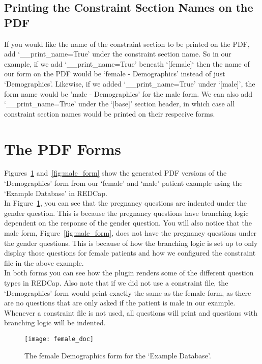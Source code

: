 \documentclass[12pt]{article}
\begin{document}
    \subsection{Printing the Constraint Section Names on the PDF}
	If you would like the name of the constraint section to be printed on the PDF, add `\_\_print\_name=True' under the constraint section name. So in our example, if we add `\_\_print\_name=True' beneath `[female]` then the name of our form on the PDF would be `female - Demographics' instead of just `Demographics'. Likewise, if we added `\_\_print\_name=True' under `[male]', the form name would be 'male - Demographics' for the male form. We can also add `\_\_print\_name=True' under the `[base]' section header, in which case all constraint section names would be printed on their respecive forms.
\newpage
\section{The PDF Forms}
Figures~\ref{fig:female_form} and~\ref{fig:male_form}  show the generated PDF versions of the `Demographics' form from our `female' and `male' patient example using the `Example Database' in REDCap. 
\\

In Figure~\ref{fig:female_form}, you can see that the pregnancy questions are indented under the gender question. This is because the pregnancy questions have branching logic dependent on the response of the gender question. You will also notice that the male form, Figure~\ref{fig:male_form},  does not have the pregnancy questions under the gender questions. This is because of how the branching logic is set up to only display those questions for female patients and how we configured the constraint file in the above example. 
\\

In both forms you can see how the plugin renders some of the different question types in REDCap. Also note that if we did not use a constraint file, the `Demographics' form would print exactly the same as the female form, as there are no questions that are only asked if the patient is male in our example. Whenever a constraint file is not used, all questions will print and questions with branching logic will be indented.
    \begin{figure}[H]
        \centering
        \texttt{[image: female\_doc]}
        \caption{The female Demographics form for the `Example Database'.}
       	\label{fig:female_form}
   \end{figure}
\end{document}
